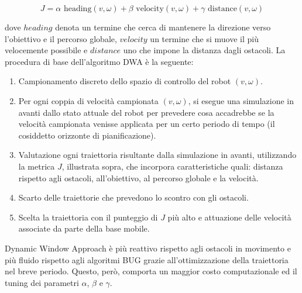 \begin{equation}
    J=\alpha \text{ heading}(v,\omega)+ \beta \text{ velocity}(v,\omega)+ \gamma \text{ distance}(v,\omega)    
\end{equation}

dove $heading$ denota un termine che cerca di mantenere la direzione verso l'obiettivo e il percorso globale, $velocity$ un termine che si muove il più velocemente possibile e $distance$ uno che impone la distanza dagli ostacoli. La procedura di base dell'algoritmo DWA è la seguente:
\begin{enumerate}
    \item Campionamento discreto dello spazio di controllo del robot $(v,\omega)$.
    \item Per ogni coppia di velocità campionata $(v,\omega)$, si esegue una simulazione in avanti dallo stato attuale del robot per prevedere cosa accadrebbe se la velocità campionata venisse applicata per un certo periodo di tempo (il cosiddetto orizzonte di pianificazione).
    \item Valutazione ogni traiettoria risultante dalla simulazione in avanti, utilizzando la metrica $J$, illustrata sopra, che incorpora caratteristiche quali: distanza rispetto agli ostacoli, all'obiettivo, al percorso globale e la velocità.
    \item Scarto delle traiettorie che prevedono lo scontro con gli ostacoli.
    \item Scelta la traiettoria con il punteggio di $J$ più alto e attuazione delle velocità associate da parte della base mobile.
\end{enumerate}
Dynamic Window Approach è più reattivo rispetto agli ostacoli in movimento e più fluido rispetto agli algoritmi BUG grazie all'ottimizzazione della traiettoria nel breve periodo. Questo, però, comporta un maggior costo computazionale ed il tuning dei parametri $\alpha$, $\beta$ e $\gamma$.

